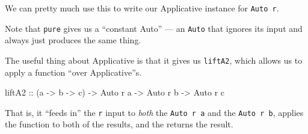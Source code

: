 \documentclass[]{article}
\newenvironment{Shaded}{}{}
\newcommand{\CommentTok}[1]{\textcolor[rgb]{0.38,0.63,0.69}{\textit{#1}}}
\newcommand{\DataTypeTok}[1]{\textcolor[rgb]{0.56,0.13,0.00}{#1}}
\newcommand{\FunctionTok}[1]{\textcolor[rgb]{0.02,0.16,0.49}{#1}}
\newcommand{\KeywordTok}[1]{\textcolor[rgb]{0.00,0.44,0.13}{\textbf{#1}}}
\newcommand{\NormalTok}[1]{#1}
\newcommand{\OtherTok}[1]{\textcolor[rgb]{0.00,0.44,0.13}{#1}}
\begin{document}
We can pretty much use this to write our Applicative instance for
\texttt{Auto\ r}.

\begin{Shaded}
\end{Shaded}

Note that \texttt{pure} gives us a ``constant Auto'' --- an \texttt{Auto} that
ignores its input and always just produces the same thing.

The useful thing about Applicative is that it gives us \texttt{liftA2}, which
allows us to apply a function ``over Applicative''s.

\begin{Shaded}
\begin{Highlighting}[]
\OtherTok{liftA2 ::}\NormalTok{ (a }\OtherTok{->}\NormalTok{ b }\OtherTok{->}\NormalTok{ c) }\OtherTok{->} \DataTypeTok{Auto}\NormalTok{ r a }\OtherTok{->} \DataTypeTok{Auto}\NormalTok{ r b }\OtherTok{->} \DataTypeTok{Auto}\NormalTok{ r c}
\end{Highlighting}
\end{Shaded}

That is, it ``feeds in'' the \texttt{r} input to \emph{both} the
\texttt{Auto\ r\ a} and the \texttt{Auto\ r\ b}, applies the function to both of
the results, and the returns the result.
\end{document}
